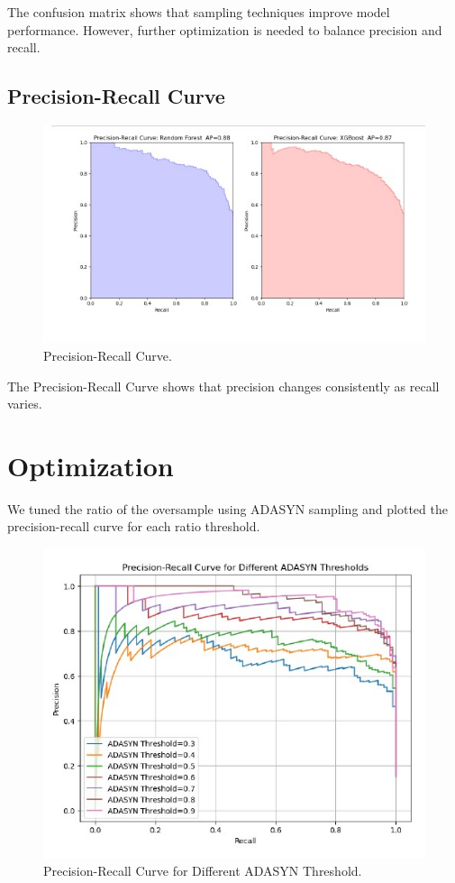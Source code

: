 \documentclass[conference]{IEEEtran}
\begin{document}
  The confusion matrix shows that sampling techniques improve model performance. However, further optimization is needed to balance precision and recall.
  
  \subsection{Precision-Recall Curve}
  
  \begin{figure}[ht]
  \centering
  \includegraphics[width=0.8\linewidth]{fig10.jpg}
  \caption{Precision-Recall Curve.}
  \label{fig10}
  \end{figure}
  
  The Precision-Recall Curve shows that precision changes consistently as recall varies.
  
  \section{Optimization}
  
  We tuned the ratio of the oversample using ADASYN sampling and plotted the precision-recall curve for each ratio threshold.
  
  \begin{figure}[ht]
      \centering
      \includegraphics[width=\linewidth]{fig11.jpg}
      \caption{Precision-Recall Curve for Different ADASYN Threshold.}
      \label{fig11}
  \end{figure}
  
\end{document}
